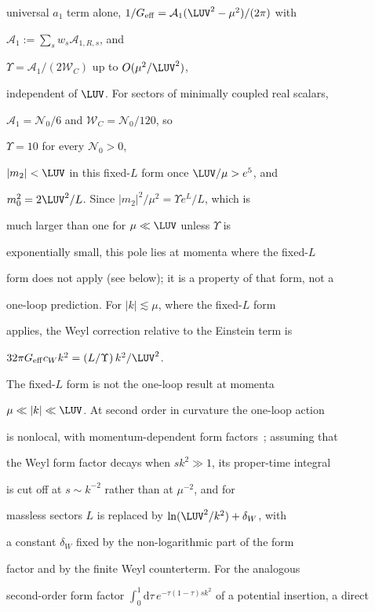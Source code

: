 universal \(a_1\) term alone, \(1/G_{\mathrm{eff}}

=\mathcal A_1(\LUV^2-\mu^2)/(2\pi)\) with

\(\mathcal A_1:=\sum_sw_s\mathcal A_{1,R,s}\), and

\(\Upsilon=\mathcal A_1/(2\mathcal W_C)\) up to \(O(\mu^2/\LUV^2)\),

independent of \(\LUV\). For sectors of minimally coupled real scalars,

\(\mathcal A_1=\mathcal N_0/6\) and \(\mathcal W_C=\mathcal N_0/120\), so

\(\Upsilon=10\) for every \(\mathcal N_0>0\),

\(|m_2|<\LUV\) in this fixed-\(L\) form once \(\LUV/\mu>e^{5}\), and

\(m_0^2=2\LUV^2/L\). Since \(|m_2|^2/\mu^2=\Upsilon e^{L}/L\), which is

much larger than one for \(\mu\ll\LUV\) unless \(\Upsilon\) is

exponentially small, this pole lies at momenta where the fixed-\(L\)

form does not apply (see below); it is a property of that form, not a

one-loop prediction. For \(|k|\lesssim\mu\), where the fixed-\(L\) form

applies, the Weyl correction relative to the Einstein term is

\(32\pi G_{\mathrm{eff}}c_Wk^2=(L/\Upsilon)\,k^2/\LUV^2\).



The fixed-\(L\) form is not the one-loop result at momenta

\(\mu\ll|k|\ll\LUV\). At second order in curvature the one-loop action

is nonlocal, with momentum-dependent form factors~\cite{BarvinskyVilkovisky1990}; assuming that

the Weyl form factor decays when \(sk^2\gg1\), its proper-time integral

is cut off at \(s\sim k^{-2}\) rather than at \(\mu^{-2}\), and for

massless sectors \(L\) is replaced by \(\ln(\LUV^2/k^2)+\delta_W\), with

a constant \(\delta_W\) fixed by the non-logarithmic part of the form

factor and by the finite Weyl counterterm. For the analogous

second-order form factor \(\int_0^1\mathrm d\tau\,

e^{-\tau(1-\tau)sk^2}\) of a potential insertion, a direct


